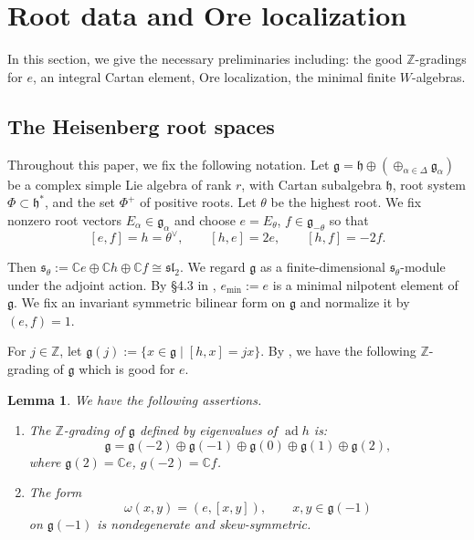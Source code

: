 \documentclass[12pt,a4paper]{amsart}
\numberwithin{equation}{section}
\newtheorem{lemma}[theorem]{Lemma}
\theoremstyle{definition}
\theoremstyle{remark}
\newcommand{\C}{\mathbb{C}}
\newcommand{\g}{\mathfrak g}
\newcommand{\h}{\mathfrak h}
\newcommand{\Z}{\mathbb Z}
\newcommand{\ad}{\operatorname{ad}}
\begin{document}
\section{Root data and Ore localization}\label{sec:roots}

In this section, we give the necessary preliminaries including: the good $\Z$-gradings for $e$,
an integral Cartan element, Ore localization, the minimal
finite $W$-algebras.

\subsection{The Heisenberg root spaces}


Throughout this paper, we fix the following notation.
Let $\g=\h\oplus(\oplus_{\alpha\in \Delta}\g_\alpha)$ be a complex simple Lie algebra of rank $r$, with Cartan subalgebra $\h$, root system $\Phi\subset\h^*$, and the set  $\Phi^+$ of  positive roots.
Let $\theta$ be the highest root.  We fix nonzero root vectors $E_\alpha\in\g_\alpha$ and choose $e=E_\theta$, $f\in\g_{-\theta}$ so that
\[
[e,f]=h=\theta^\vee,\qquad [h,e]=2e,\qquad[h,f]=-2f.
\]

Then
\(
\mathfrak s_\theta:=\C e\oplus \C h\oplus \C f 
\cong\mathfrak{sl}_2
\).
We regard $\mathfrak g$ as a finite-dimensional
$\mathfrak s_\theta$-module under the adjoint action.
 By \S 4.3 in \cite{CM}, $e_{\min}:=e$ is a minimal nilpotent element of $\g$. We fix an invariant symmetric bilinear form on $\g$ and normalize it by $(e,f)=1$.

For $j\in \Z$, let $\g(j):=
\{x\in\mathfrak g\mid[h,x]=jx\}$.
By \cite{Pr2}, we have the following $\Z$-grading of $\g$
which is good for $e$.

\begin{lemma}
\label{lem:short-grading}We have the following assertions.
\begin{enumerate}
\item The $\Z$-grading of $\mathfrak g$ defined by
eigenvalues of $\ad h$ is:
\begin{equation}\label{eq:grading}
\mathfrak g
=
\mathfrak g(-2)\oplus
\mathfrak g(-1)\oplus
\mathfrak g(0)\oplus
\mathfrak g(1)\oplus
\mathfrak g(2),
\end{equation}
where
$\mathfrak g(2)=\C e$,
$g(-2)=\mathbb C f$.
\item The form
\[
 \omega(x,y)=(e,[x,y]), \qquad x,y\in\g(-1)
\]
on $\g(-1)$ is nondegenerate and skew-symmetric.
\end{enumerate}
\end{lemma}
\end{document}
